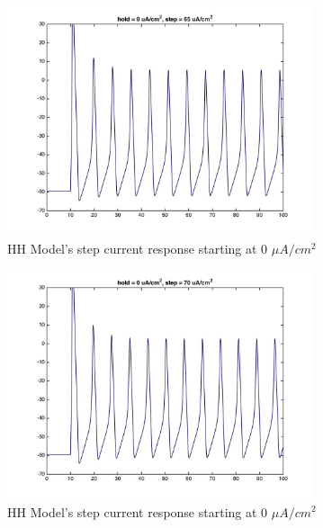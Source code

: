 \documentclass{beamer}
\begin{document}
\begin{frame}
  \begin{figure}
    \centering
    \includegraphics[width = 0.8\textwidth]{./images/current_0_65.jpg}
    \caption{HH Model's step current response starting at 0 $\mu A/cm^2$}
  \end{figure}
\end{frame}


\begin{frame}
  \begin{figure}
    \centering
    \includegraphics[width = 0.8\textwidth]{./images/current_0_70.jpg}
    \caption{HH Model's step current response starting at 0 $\mu A/cm^2$}
  \end{figure}
\end{frame}
\end{document}
